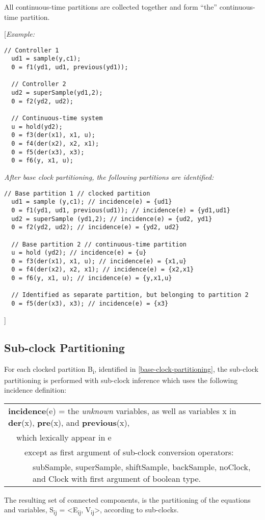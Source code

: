 All continuous-time partitions are collected together and form ``the''
continuous-time partition.

{[}\emph{Example:}
\begin{lstlisting}[language=modelica]
  // Controller 1
  ud1 = sample(y,c1);
  0 = f1(yd1, ud1, previous(yd1));

  // Controller 2
  ud2 = superSample(yd1,2);
  0 = f2(yd2, ud2);

  // Continuous-time system
  u = hold(yd2);
  0 = f3(der(x1), x1, u);
  0 = f4(der(x2), x2, x1);
  0 = f5(der(x3), x3);
  0 = f6(y, x1, u);
\end{lstlisting}

\emph{After base clock partitioning, the following partitions are
identified:}

\begin{lstlisting}[language=modelica]
  // Base partition 1 // clocked partition
  ud1 = sample (y,c1); // incidence(e) = {ud1}
  0 = f1(yd1, ud1, previous(ud1)); // incidence(e) = {yd1,ud1}
  ud2 = superSample (yd1,2); // incidence(e) = {ud2, yd1}
  0 = f2(yd2, ud2); // incidence(e) = {yd2, ud2}
  
  // Base partition 2 // continuous-time partition
  u = hold (yd2); // incidence(e) = {u}
  0 = f3(der(x1), x1, u); // incidence(e) = {x1,u}
  0 = f4(der(x2), x2, x1); // incidence(e) = {x2,x1}
  0 = f6(y, x1, u); // incidence(e) = {y,x1,u}
  
  // Identified as separate partition, but belonging to partition 2
  0 = f5(der(x3), x3); // incidence(e) = {x3}
\end{lstlisting}
{]}

\subsection{Sub-clock Partitioning}

For each clocked partition B\textsubscript{i}, identified in 
\autoref{base-clock-partitioning}, the sub-clock partitioning is performed with sub-clock inference
which uses the following incidence definition:

\begin{tabular}{p{1cm}p{1cm}p{1cm}p{12cm}}
\multicolumn{4}{p{15cm}}{\textbf{incidence}(e) = the \emph{unknown} variables, as well as
variables x in \textbf{der}(x), \textbf{pre}(x), and
\textbf{previous}(x),}\\
&\multicolumn{3}{p{14cm}}{which lexically appear in e}\\
&&\multicolumn{2}{p{13cm}}{except as first argument of sub-clock conversion operators:}\\
&&&\multicolumn{1}{p{12cm}}{subSample, superSample, shiftSample, backSample, noClock, and Clock with first argument of boolean type.}
\end{tabular}
The resulting set of connected components, is the partitioning of the
equations and variables, S\textsubscript{ij} =
\textless{}E\textsubscript{ij}, V\textsubscript{ij}\textgreater{},
according to sub-clocks.

